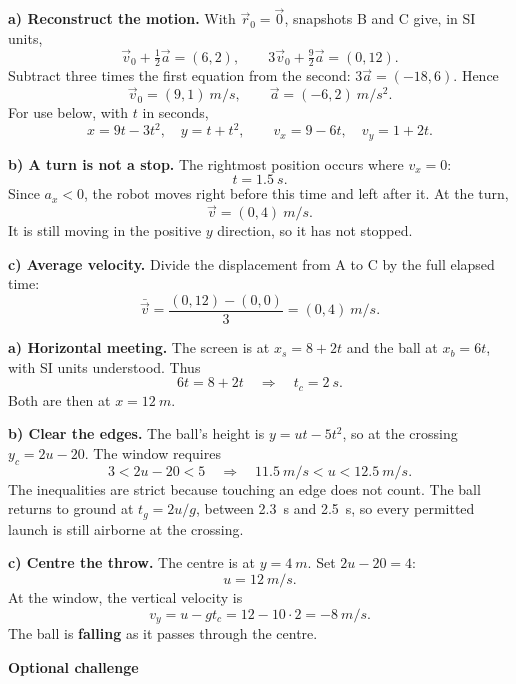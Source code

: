 \documentclass[11pt,a4paper]{article}
\begin{document}


\textbf{a) Reconstruct the motion.} With $\vec r_0=\vec0$, snapshots B and C give, in SI units,  
\[
\vec v_0+\tfrac12\vec a=(6,2),\qquad
3\vec v_0+\tfrac92\vec a=(0,12).
\]
Subtract three times the first equation from the second:
$3\vec a=(-18,6)$. Hence
\[
\boxed{\vec v_0=(9,1)\ \si{m/s},\qquad \vec a=(-6,2)\ \si{m/s^2}.}
\]
For use below, with $t$ in seconds,
\[
x=9t-3t^2,\quad y=t+t^2,\qquad v_x=9-6t,\quad v_y=1+2t.
\]

\textbf{b) A turn is not a stop.} The rightmost position occurs where $v_x=0$:
\[
\boxed{t=\SI{1.5}{s}.}
\]
Since $a_x<0$, the robot moves right before this time and left after it. At the turn,
\[
\vec v=(0,4)\ \si{m/s}.
\]
It is still moving in the positive $y$ direction, so it has not stopped.

\textbf{c) Average velocity.} Divide the displacement from A to C by the full elapsed time:
\[
\boxed{\bar{\vec v}=\frac{(0,12)-(0,0)}{3}=(0,4)\ \si{m/s}.}
\]

\clearpage
{}

\textbf{a) Horizontal meeting.} The screen is at $x_s=8+2t$ and the ball at $x_b=6t$, with SI units understood. Thus
\[
6t=8+2t\quad\Longrightarrow\quad \boxed{t_c=\SI{2}{s}.}
\]
Both are then at $x=\SI{12}{m}$.

\textbf{b) Clear the edges.} The ball's height is $y=ut-5t^2$, so at the crossing $y_c=2u-20$. The window requires
\[
3<2u-20<5\quad\Longrightarrow\quad
\boxed{\SI{11.5}{m/s}<u<\SI{12.5}{m/s}.}
\]
The inequalities are strict because touching an edge does not count. The ball returns to ground at $t_g=2u/g$, between \SI{2.3}{s} and \SI{2.5}{s}, so every permitted launch is still airborne at the crossing.

\textbf{c) Centre the throw.} The centre is at $y=\SI{4}{m}$. Set $2u-20=4$:
\[
\boxed{u=\SI{12}{m/s}.}
\]
At the window, the vertical velocity is
\[
v_y=u-gt_c=12-10\cdot2=\SI{-8}{m/s}.
\]
The ball is \textbf{falling} as it passes through the centre.


\clearpage
{}
{\color{VectorCoral}\bfseries Optional challenge}
\end{document}
